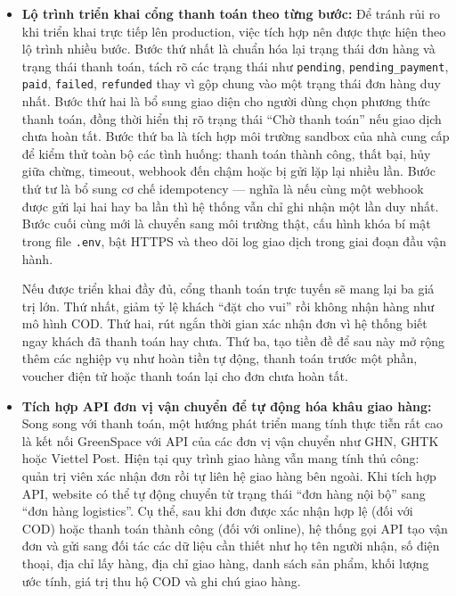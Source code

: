 \documentclass[11pt, a4paper]{article}
\begin{document}
\begin{itemize}[leftmargin=*]
    \item \textbf{Lộ trình triển khai cổng thanh toán theo từng bước:}
    Để tránh rủi ro khi triển khai trực tiếp lên production, việc tích hợp
    nên được thực hiện theo lộ trình nhiều bước. Bước thứ nhất là chuẩn hóa
    lại trạng thái đơn hàng và trạng thái thanh toán, tách rõ các trạng thái
    như \texttt{pending}, \texttt{pending\_payment}, \texttt{paid},
    \texttt{failed}, \texttt{refunded} thay vì gộp chung vào một trạng thái
    đơn hàng duy nhất. Bước thứ hai là bổ sung giao diện cho người dùng chọn
    phương thức thanh toán, đồng thời hiển thị rõ trạng thái ``Chờ thanh toán''
    nếu giao dịch chưa hoàn tất. Bước thứ ba là tích hợp môi trường sandbox
    của nhà cung cấp để kiểm thử toàn bộ các tình huống: thanh toán thành
    công, thất bại, hủy giữa chừng, timeout, webhook đến chậm hoặc bị gửi
    lặp lại nhiều lần. Bước thứ tư là bổ sung cơ chế idempotency --- nghĩa là
    nếu cùng một webhook được gửi lại hai hay ba lần thì hệ thống vẫn chỉ ghi
    nhận một lần duy nhất. Bước cuối cùng mới là chuyển sang môi trường thật,
    cấu hình khóa bí mật trong file \texttt{.env}, bật HTTPS và theo dõi log
    giao dịch trong giai đoạn đầu vận hành.

    Nếu được triển khai đầy đủ, cổng thanh toán trực tuyến sẽ mang lại ba giá
    trị lớn. Thứ nhất, giảm tỷ lệ khách ``đặt cho vui'' rồi không nhận hàng
    như mô hình COD. Thứ hai, rút ngắn thời gian xác nhận đơn vì hệ thống biết
    ngay khách đã thanh toán hay chưa. Thứ ba, tạo tiền đề để sau này mở rộng
    thêm các nghiệp vụ như hoàn tiền tự động, thanh toán trước một phần,
    voucher điện tử hoặc thanh toán lại cho đơn chưa hoàn tất.

    \item \textbf{Tích hợp API đơn vị vận chuyển để tự động hóa khâu giao hàng:}
    Song song với thanh toán, một hướng phát triển mang tính thực tiễn rất cao
    là kết nối GreenSpace với API của các đơn vị vận chuyển như GHN, GHTK hoặc
    Viettel Post. Hiện tại quy trình giao hàng vẫn mang tính thủ công: quản trị
    viên xác nhận đơn rồi tự liên hệ giao hàng bên ngoài. Khi tích hợp API,
    website có thể tự động chuyển từ trạng thái ``đơn hàng nội bộ'' sang
    ``đơn hàng logistics''. Cụ thể, sau khi đơn được xác nhận hợp lệ (đối với
    COD) hoặc thanh toán thành công (đối với online), hệ thống gọi API tạo vận
    đơn và gửi sang đối tác các dữ liệu cần thiết như họ tên người nhận, số
    điện thoại, địa chỉ lấy hàng, địa chỉ giao hàng, danh sách sản phẩm, khối
    lượng ước tính, giá trị thu hộ COD và ghi chú giao hàng.


\end{itemize}
\end{document}
